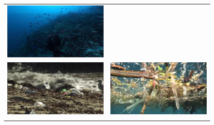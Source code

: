 \begin{figure}
{\begin{tabular}{rl}
%
\colorbox{white!0}{ \colorbox{green!80}{
\includegraphics[keepaspectratio=true,width=\iwith]{images/matrix/2737_10.jpg}}}\\
%
\colorbox{red!70}{ \colorbox{green!80}{
\includegraphics[keepaspectratio=true,width=\iwith]{images/matrix/31_11.jpg}}}&
%
\colorbox{white!0}{ \colorbox{red!70}{
\includegraphics[keepaspectratio=true,width=\iwith]{images/matrix/4409_01.jpg}}}\\
%
\colorbox{white!0}{ \colorbox{green!80}{
}}
\end{tabular}}
\end{figure}
